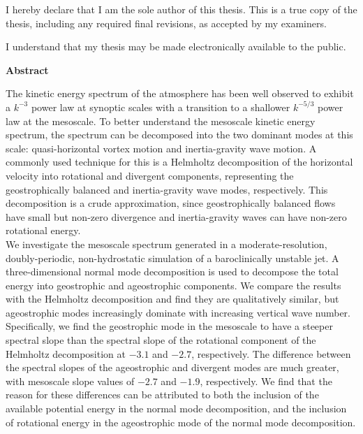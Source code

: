 \cleardoublepage %
 


  \noindent
I hereby declare that I am the sole author of this thesis. This is a true copy of the thesis, including any required final revisions, as accepted by my examiners.

  \bigskip
  
  \noindent
I understand that my thesis may be made electronically available to the public.

\cleardoublepage


\begin{center}\textbf{Abstract}\end{center}

The kinetic energy spectrum of the atmosphere has been well observed to exhibit a $k^{-3}$ power law at synoptic scales with a transition to a shallower $k^{-5/3}$ power law at the mesoscale.  To better understand the mesoscale kinetic energy spectrum, the spectrum can be decomposed into the two dominant modes at this scale: quasi-horizontal vortex motion and inertia-gravity wave motion.  A commonly used technique for this is a Helmholtz decomposition of the horizontal velocity into rotational and divergent components, representing the geostrophically balanced and inertia-gravity wave modes, respectively.  This decomposition is a crude approximation, since geostrophically balanced flows have small but non-zero divergence and inertia-gravity waves can have non-zero rotational energy.\\

We investigate the mesoscale spectrum generated in a moderate-resolution, doubly-periodic, non-hydrostatic simulation of a baroclinically unstable jet.  A three-dimensional normal mode decomposition is used to decompose the total energy into geostrophic and ageostrophic components. We compare the results with the Helmholtz decomposition and find they are qualitatively similar, but ageostrophic modes increasingly dominate with increasing vertical wave number. Specifically, we find the geostrophic mode in the mesoscale to have a steeper spectral slope than the spectral slope of the rotational component of the Helmholtz decomposition at $-3.1$ and $-2.7$, respectively. The difference between the spectral slopes of the ageostrophic and divergent modes are much greater, with mesoscale slope values of $-2.7$ and $-1.9$, respectively. We find that the reason for these differences can be attributed to both the inclusion of the available potential energy in the normal mode decomposition, and the inclusion of rotational energy in the ageostrophic mode of the normal mode decomposition.

